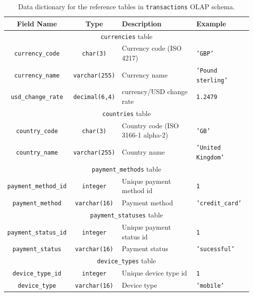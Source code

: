 \documentclass[11pt,a4paper,computermodern]{article}
\newcommand{\code}{\texttt}
\begin{document}
\begin{table}[ht]
	\centering
	\begin{threeparttable}
		\caption{Data dictionary for the reference tables in \code{transactions} OLAP schema.}
		\label{table:OLAP_ref}
		\begin{tabularx}{0.99\textwidth}{c c >{\centering\arraybackslash}X >{\centering\arraybackslash}X}
			\toprule
			Field Name & Type & Description & Example  \\
			\midrule
			\multicolumn{4}{c}{\code{currencies} table}\\
			\code{currency\_code} & \code{char(3)} & Currency code (ISO 4217) & \code{'GBP'} \\
			\code{currency\_name} & \code{varchar(255)} & Currency name & \code{'Pound sterling'} \\
			\code{usd\_change\_rate} & \code{decimal(6,4)} & currency/USD change rate & \code{1.2479} \\
			
			\midrule
			\multicolumn{4}{c}{\code{countries} table}\\
			\code{country\_code} & \code{char(3)} & Country code (ISO 3166-1 alpha-2) & \code{'GB'} \\
			\code{country\_name} & \code{varchar(255)} & Country name & \code{'United Kingdom'} \\
			
			\midrule
			\multicolumn{4}{c}{\code{payment\_methods} table}\\
			\code{payment\_method\_id} & \code{integer} & Unique payment method id & \code{1} \\
			\code{payment\_method} & \code{varchar(16)} & Payment method & \code{'credit\_card'} \\
			
			\midrule
			\multicolumn{4}{c}{\code{payment\_statuses} table}\\
			\code{payment\_status\_id} & \code{integer} & Unique payment status id & \code{1} \\
			\code{payment\_status} & \code{varchar(16)} & Payment status & \code{'sucessful'} \\
			
			\midrule
			\multicolumn{4}{c}{\code{device\_types} table}\\
			\code{device\_type\_id} & \code{integer} & Unique device type id & \code{1} \\
			\code{device\_type} & \code{varchar(16)} & Device type & \code{'mobile'} \\
			

\end{tabularx}
\end{threeparttable}
\end{table}
\end{document}

